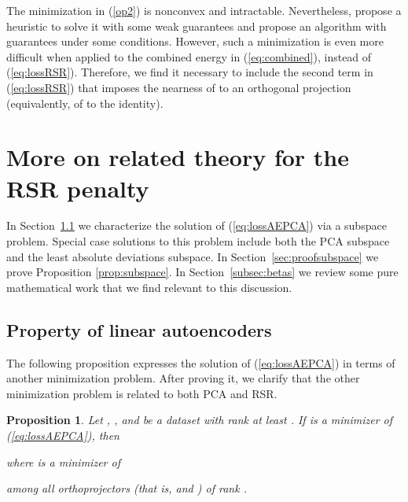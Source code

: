 \documentclass{article} \usepackage{iclr2020_conference,times}
\def\Secref#1{Section~\ref{#1}}
\def\eqref#1{(\ref{#1})}
\newtheorem{proposition}{Proposition}[section]
\begin{document}
The minimization in \eqref{op2} is nonconvex and intractable. Nevertheless, \citet{lerman2017fast} propose a heuristic to solve it with some weak guarantees 
and \citet{maunu2017well} propose an algorithm with guarantees under some conditions.
However, such a minimization is even more difficult when applied to the combined energy in \eqref{eq:combined}, instead of \eqref{eq:lossRSR}. Therefore, we find it necessary to include the second term in \eqref{eq:lossRSR} that imposes the nearness of  to an orthogonal projection (equivalently, of  to the identity). 


\section{More on related theory for the RSR penalty}
\label{sec:GAN}

In \Secref{subsec:linearaeforrsr} we characterize the solution of \eqref{eq:lossAEPCA} via a subspace problem. Special case solutions to this problem include both the PCA subspace and the least absolute deviations subspace.
In \Secref{sec:proofsubspace} we prove Proposition \ref{prop:subspace}. In \Secref{subsec:betas} we review some pure mathematical work that we find relevant to this discussion. 
\subsection{Property of linear autoencoders} \label{subsec:linearaeforrsr}
The following proposition expresses the solution of \eqref{eq:lossAEPCA} in terms of another minimization problem.
After proving it, we clarify that the other minimization problem is related to both PCA and RSR.

\begin{proposition}
\label{prop:deforpcarsr}
Let , , and  be a dataset with rank at least . If  is a minimizer of \eqref{eq:lossAEPCA}, then

where  is a minimizer of 

among all orthoprojectors  (that is,  and ) of rank . 
\end{proposition}
\end{document}
